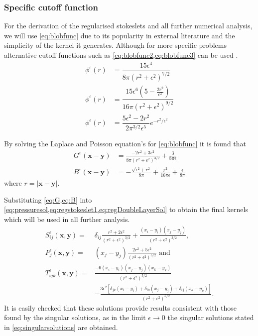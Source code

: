 \subsubsection{Specific cutoff function}
For the derivation of the regularised stokeslets and all further numerical analysis, we will use \cref{eq:blobfunc} due to its popularity in external literature and the simplicity of the kernel it generates. Although for more specific problems alternative cutoff functions such as \cref{eq:blobfunc2,eq:blobfunc3} can be used \cite{Olson2013ModelingFormulation,Nguyen2014ReductionFlow,Zhao2019}.
\begin{align}
    \label{eq:blobfunc}\phi^\epsilon(r) &= \dfrac{15 \epsilon^4}{8\pi\left( r^2 +\epsilon^2 \right)^{7/2}} \\
    \label{eq:blobfunc2}\phi^{\epsilon}(r) &= \dfrac{15 \epsilon^{6}\left(5-\frac{2 r^{2}}{\epsilon^{2}}\right)}{16 \pi\left(r^{2}+\epsilon^{2}\right)^{9 / 2}}\\
    \label{eq:blobfunc3}\phi^{\epsilon}(r) &= \dfrac{5 \epsilon^{2}-2 r^{2}}{2 \pi^{3 / 2} \epsilon^{5}} e^{-r^{2} / \epsilon^{2}} 
\end{align}

By solving the Laplace and Poisson equation's for \cref{eq:blobfunc} it is found that
\begin{subequations}
\begin{align}
    G^\varepsilon(\bm{x}-\bm{y}) &= \frac{-2r^2+3\epsilon^2}{8\pi(r^2+\epsilon^2)^{3/2}} + \frac{3}{8\pi\epsilon} \label{eq:G}\\
    B^\varepsilon(\bm{x}-\bm{y}) &= -\frac{\sqrt{\epsilon^2+r^2}}{8\pi} + \frac{r^2}{16\pi\epsilon} + \frac{\epsilon}{8\pi}\label{eq:B}
\end{align}
\end{subequations}
where $r=|\bm{x}-\bm{y}|$. 

Substituting \cref{eq:G,eq:B} into \cref{eq:pressuresol,eq:regstokeslet1,eq:regDoubleLayerSol} to obtain the final kernels which will be used in all further analysis.
\begin{subequations}
\begin{align}
    S_{ij}^\epsilon(\bm{x}, \bm{y}) =& \delta_{ij} \frac{r^2+2\epsilon^2}{\left( r^2 + \epsilon^2 \right)^{3/2}} + \frac{(x_i-y_{i})(x_j-y_{j})}{\left( r^2 + \epsilon^2 \right)^{3/2}}, \label{eq:regstokeslet2} \\
    P_j^\epsilon(\bm{x}, \bm{y}) =& (x_j-y_{j})\frac{2r^2+5\epsilon^2}{(r^2+\epsilon^2)^{5/2}} \text{ and } \label{eq:pressuresol2} \\
    T_{ijk}^\epsilon(\bm{x}, \bm{y}) =& \frac{-6(x_i-y_{i})(x_j-y_{j})(x_k-y_{k})}{(r^2+\epsilon^2)^{5/2}} \label{eq:doublelayer2}\\
    &-\frac{3\epsilon^2[\delta_{jk}(x_i-y_{i}) +\delta_{ik}(x_j-y_{j})+\delta_{ij}(x_k-y_{k})]}{(r^2+\epsilon^2)^{5/2}}. \nonumber
\end{align}
\end{subequations}
It is easily checked that these solutions provide results consistent with those found by the singular solutions, as in the limit $\epsilon \to 0$  the singular solutions stated in \cref{eq:singularsolutions} are obtained.

